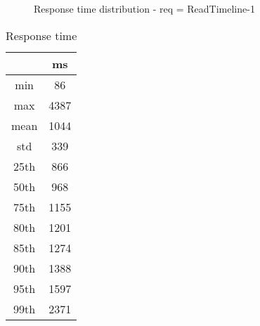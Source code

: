 \begin{minipage}{0.75\linewidth}
\begin{figure}[h]
\begin{adjustbox}{max width=1.0\linewidth, keepaspectratio}
  \end{adjustbox}
  \caption{Response time distribution - req = ReadTimeline-1}
\end{figure}
\end{minipage}\hfill\begin{minipage}{0.18\linewidth}
\begin{table}[h]
\begin{tabular}{|cc|}
\hline
\textbf{} & \textbf{ms}\\ \hline
 \Xhline{0.005\arrayrulewidth}
min & 86\\
 \Xhline{0.005\arrayrulewidth}
max & 4387\\
 \Xhline{0.005\arrayrulewidth}
mean & 1044\\
 \Xhline{0.005\arrayrulewidth}
std & 339\\
\hline
\hline
 \Xhline{0.005\arrayrulewidth}
25th & 866\\
 \Xhline{0.005\arrayrulewidth}
50th & 968\\
 \Xhline{0.005\arrayrulewidth}
75th & 1155\\
 \Xhline{0.005\arrayrulewidth}
80th & 1201\\
 \Xhline{0.005\arrayrulewidth}
85th & 1274\\
 \Xhline{0.005\arrayrulewidth}
90th & 1388\\
 \Xhline{0.005\arrayrulewidth}
95th & 1597\\
 \Xhline{0.005\arrayrulewidth}
99th & 2371\\
\hline
\end{tabular}
\caption{Response time}
\end{table}
\end{minipage}\hfill
